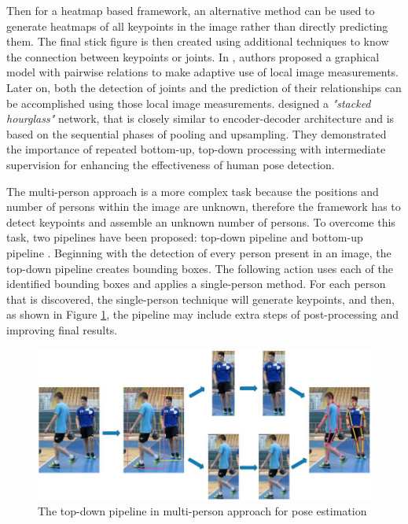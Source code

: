 Then for a heatmap based framework, an alternative method can be used to generate heatmaps of all keypoints in the image
rather than directly predicting them. The final stick figure is then created using additional techniques to know the connection between keypoints or joints.
In \parencite{chen2014}, authors proposed a graphical model with pairwise
relations to make adaptive use of local image measurements. Later on, both the detection of joints and the prediction of their relationships can be accomplished using those local image measurements.
\parencite{newell2016} designed a \emph{"stacked hourglass"} network, that is closely similar to encoder-decoder architecture and is based on the sequential phases of pooling and upsampling.
They demonstrated the importance of repeated bottom-up, top-down processing with intermediate supervision for enhancing the effectiveness of human pose detection.

The multi-person approach is a more complex task because
the positions and number of persons within the image are unknown, therefore the framework has to detect keypoints and assemble an unknown number of persons. To overcome this task,
two pipelines have been proposed: top-down pipeline and bottom-up pipeline \parencite{romeo}.
Beginning with the detection of every person present in an image, the top-down pipeline creates bounding boxes. The following action uses each of the identified bounding boxes and applies a single-person method. 
For each person that is discovered, the single-person technique will generate keypoints, and then, as shown in Figure \ref{fig:top-down-approach}, the pipeline may include extra steps of post-processing and improving final results.

\begin{figure}[ht]
  \centering
  \includegraphics[scale=0.8]{gambar/top-down-approach.png}
  \caption{The top-down pipeline in multi-person approach for pose estimation}
  \label{fig:top-down-approach}
\end{figure}

